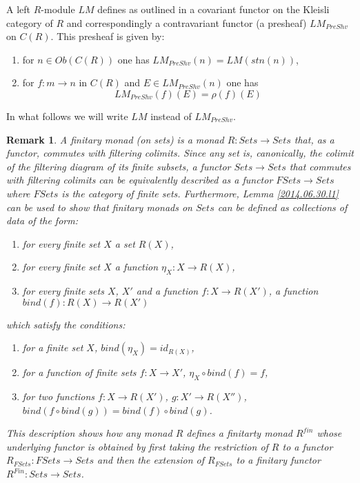 \documentclass[11pt]{article}
\newenvironment{eq}{\begin{equation}}{\end{equation}}
\newtheorem{remark}[proposition]{Remark}
\newcommand{\llabel}[1]{\label{#1}[{\bf #1}]}
\newcommand{\comment}[1]{}
\newcommand{\sr}{\rightarrow}
\newcommand{\wh}{\widehat}
\newcommand{\bind}{bind}
\newcommand{\mbind}{\rho}
\newcommand{\spc}{{\,\,\,\,\,\,\,}}
\begin{document}
{A left $R$-module $LM$ defines as outlined in \cite[Def. 10]{HM2010} a covariant functor on the Kleisli category of $R$ and correspondingly a contravariant functor (a presheaf) $LM_{PreShv}$ on ${C(R)}$. This presheaf is given by:
%
\begin{enumerate}
\item for $n\in Ob({C(R)})$ one has $LM_{PreShv}(n)=LM({stn(n)})$,
\item for $f:m\sr n$ in ${C(R)}$ and $E\in LM_{PreShv}(n)$ one has
%
$$LM_{PreShv}(f)(E)=\mbind(f)(E)$$
%
\end{enumerate}
%
In what follows we will write $LM$ instead of $LM_{PreShv}$.  

\comment{
For two morphisms 
%
$$f:\wh{n_1}\sr \wh{n_2}\spc f=(f_1,\dots,f_{n_2})\spc where\spc f_i\in R(\wh{n_1})$$
$$g:\wh{n_2}\sr \wh{n_3}\spc g=(g_1,\dots,g_{n_3})\spc where\spc g_i\in R(\wh{n_2})$$
%
their composition is given by
%
\begin{eq}\llabel{2015.07.26.eq1}
f\circ g:\wh{n_1}\sr \wh{n_3}\spc f\circ g=((f\circ g)_1,\dots,(f\circ g)_{n_3}) \spc where\spc (f\circ g)_i\in R(\wh{n_3})
\end{eq}
%
and 
%
\begin{eq}\llabel{2015.07.26.eq2}
(f\circ g)_i=(f_1,\dots,f_{n_2})\circ g_i=g_i(f_1/1,\dots,f_{n_2}/n_2)
\end{eq}
%
}
%
\begin{remark}\rm
A finitary monad (on sets) is a monad $R:Sets\sr Sets$ that, as a functor, commutes with filtering colimits. Since any set is, canonically, the colimit of the filtering diagram of its finite subsets, a functor $Sets \sr Sets$ that commutes with filtering colimits can be equivalently described as a functor $FSets \sr Sets$ where $FSets$ is the category of finite sets. Furthermore, Lemma \ref{2014.06.30.l1} can be used to show that finitary monads on $Sets$ can be defined as collections of data of the form:
%
\begin{enumerate}
\item for every finite set $X$ a set $R(X)$,
\item for every finite set $X$ a function $\eta_X: X \sr R(X)$,
\item for every finite sets $X$, $X'$ and a function $f:X\sr R(X')$, a function $ \bind(f):R(X)\sr R(X')$
\end{enumerate}
%
which satisfy the conditions:
%
\begin{enumerate}
\item for a finite set $X$, $\bind(\eta_X)=id_{R(X)}$,
\item for a function of finite sets $f:X\sr X'$, $\eta_X\circ \bind(f)=f$,
\item for two functions $f:X\sr R(X')$, $g:X'\sr R(X'')$, $ \bind(f\circ \bind(g))= \bind(f)\circ \bind(g)$.
\end{enumerate}
%
This description shows how any monad $R$ defines a finitarty monad $R^{fin}$ whose underlying functor is obtained by first taking the restriction of $R$ to a functor $R_{FSets}:FSets\sr Sets$ and then the extension of $R_{FSets}$ to a finitary functor $R^{Fin}:Sets\sr Sets$. 


\end{remark}}
\end{document}
